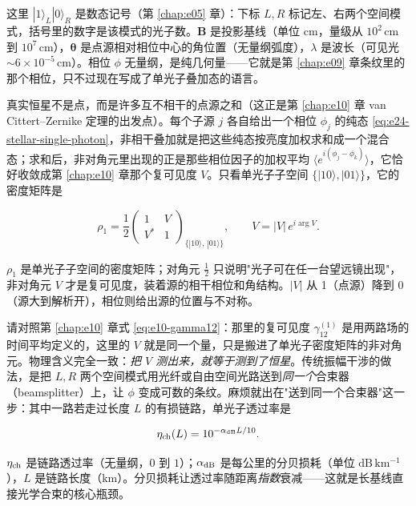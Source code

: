 这里 \(|1\rangle_L|0\rangle_R\) 是数态记号（第 \ref{chap:e05} 章）：下标 \(L,R\) 标记左、右两个空间模式，括号里的数字是该模式的光子数。\(\bm{B}\) 是投影基线（单位 cm，量级从 \(10^2\,\mathrm{cm}\) 到 \(10^7\,\mathrm{cm}\)），\(\bm{\theta}\) 是点源相对相位中心的角位置（无量纲弧度），\(\lambda\) 是波长（可见光 \(\sim6\times10^{-5}\,\mathrm{cm}\)）。相位 \(\phi\) 无量纲，是纯几何量——它就是第 \ref{chap:e09} 章条纹里的那个相位，只不过现在写成了单光子叠加态的语言。

真实恒星不是点，而是许多互不相干的点源之和（这正是第 \ref{chap:e10} 章 van Cittert--Zernike 定理的出发点）。每个子源 \(j\) 各自给出一个相位 \(\phi_j\) 的纯态 \eqref{eq:e24-stellar-single-photon}，非相干叠加就是把这些纯态按亮度加权求和成一个混合态；求和后，非对角元里出现的正是那些相位因子的加权平均 \(\langle e^{i(\phi_j-\phi_k)}\rangle\)，它恰好收敛成第 \ref{chap:e10} 章那个复可见度 \(V\)。只看单光子子空间 \(\{|10\rangle,|01\rangle\}\)，它的密度矩阵是

\begin{equation}
  \rho_1
  =
  \frac{1}{2}
  \begin{pmatrix}
  1 & V\\[2pt]
  V^* & 1
  \end{pmatrix}_{\{|10\rangle,\,|01\rangle\}} ,
  \qquad
  V=|V|\,e^{i\arg V}.
  \label{eq:e24-single-photon-density}
\end{equation}
\begin{formulaexplain}
\(\rho_1\) 是单光子子空间的密度矩阵；对角元 \(\tfrac12\) 只说明"光子可在任一台望远镜出现"，非对角元 \(V\) 才是复可见度，装着源的相干相位和角结构。\(|V|\) 从 1（点源）降到 0（源大到解析开），相位则给出源的位置与不对称。
\end{formulaexplain}

请对照第 \ref{chap:e10} 章式 \eqref{eq:e10-gamma12}：那里的复可见度 \(\gamma^{(1)}_{12}\) 是用两路场的时间平均定义的，这里的 \(V\) 就是同一个量，只是搬进了单光子密度矩阵的非对角元。物理含义完全一致：\emph{把 \(V\) 测出来，就等于测到了恒星}。传统振幅干涉的做法，是把 \(L,R\) 两个空间模式用光纤或自由空间光路送到\emph{同一个}合束器（beamsplitter）上，让 \(\phi\) 变成可数的条纹。麻烦就出在"送到同一个合束器"这一步：其中一路若走过长度 \(L\) 的有损链路，单光子透过率是

\begin{equation}
  \eta_{\rm ch}(L)=10^{-\alpha_{\rm dB}L/10}.
  \label{eq:e24-link-loss}
\end{equation}
\begin{formulaexplain}
\(\eta_{\rm ch}\) 是链路透过率（无量纲，\(0\) 到 \(1\)）；\(\alpha_{\rm dB}\) 是每公里的分贝损耗（单位 \(\mathrm{dB\,km^{-1}}\)），\(L\) 是链路长度（km）。分贝损耗让透过率随距离\emph{指数}衰减——这就是长基线直接光学合束的核心瓶颈。
\end{formulaexplain}

